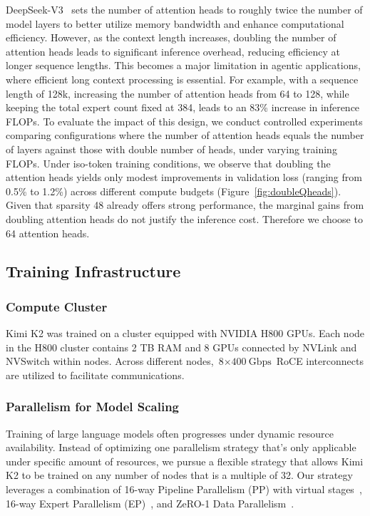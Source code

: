 DeepSeek-V3~\citep{deepseekai2024deepseekv3technicalreport}  sets the number of attention heads to roughly twice the number of model layers to better utilize memory bandwidth and enhance computational efficiency. 
However, as the context length increases, doubling the number of attention heads leads to significant inference overhead, reducing efficiency at longer sequence lengths. This becomes a major limitation in agentic applications, where efficient long context processing is essential.
For example, with a sequence length of 128k, increasing the number of attention heads from 64 to 128, while keeping the total expert count fixed at 384, leads to an 83\% increase in inference FLOPs.
To evaluate the impact of this design, we conduct controlled experiments comparing configurations where the number of attention heads equals the number of layers against those with double number of heads, under varying training FLOPs. Under iso-token training conditions, we observe that doubling the attention heads yields only modest improvements in validation loss (ranging from 0.5\% to 1.2\%) across different compute budgets (Figure~\ref{fig:doubleQheads}).
Given that sparsity 48 already offers strong performance, the marginal gains from doubling attention heads do not justify the inference cost. Therefore we choose to 64 attention heads.

\subsection{Training Infrastructure}
\subsubsection{Compute Cluster}

Kimi K2 was trained on a cluster equipped with NVIDIA H800 GPUs. Each node in
the H800 cluster contains 2 TB RAM and 8 GPUs connected by NVLink and NVSwitch within nodes. Across
different nodes, $\text{8}\!\times\!\text{400}~\text{Gbps}$ RoCE interconnects are utilized to facilitate communications.

\subsubsection{Parallelism for Model Scaling}

Training of large language models often progresses under dynamic resource availability. Instead of optimizing one parallelism strategy that's only applicable under specific amount of resources, we pursue a flexible strategy that allows Kimi K2 to be trained on any number of nodes that is a multiple of 32.
Our strategy leverages a combination of 16-way Pipeline Parallelism (PP) with virtual stages~\citep{huang2019gpipe, narayanan2021efficient, lamy2023breadth, qi2023zero, Liu_2023, harlap2018pipedream}, 16-way Expert Parallelism (EP)~\citep{lepikhin2020gshard}, and ZeRO-1 Data Parallelism~\citep{rajbhandari2020zero}.

